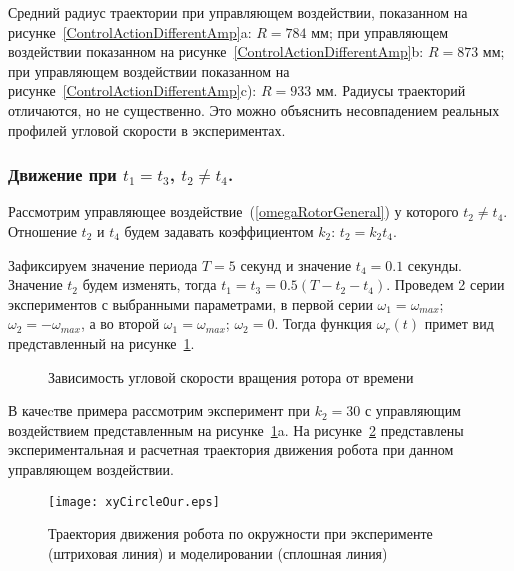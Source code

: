 Средний радиус траектории при управляющем воздействии, показанном на рисунке~\ref{ControlActionDifferentAmp}a: $ R = 784 $ мм; при управляющем воздействии показанном на рисунке~\ref{ControlActionDifferentAmp}b: $ R = 873 $ мм; при управляющем воздействии показанном на рисунке~\ref{ControlActionDifferentAmp}c): $ R = 933 $ мм. Радиусы траекторий отличаются, но не существенно. Это можно объяснить несовпадением реальных профилей угловой скорости в экспериментах.


\subsubsection{Движение при $ t_1 = t_3 $, $ t_2 \neq t_4 $.}

Рассмотрим управляющее воздействие~(\ref{omegaRotorGeneral}) у которого $ t_2 \neq t_4 $. Отношение $ t_2 $ и $t_4 $ будем задавать коэффициентом $ k_2 $: $ t_2 = k_2t_4 $.

Зафиксируем значение периода $ T=5 $ секунд и значение $ t_4 = 0.1 $ секунды. Значение $ t_2 $ будем изменять, тогда $ t_1 = t_3 = 0.5(T - t_2 - t_4) $. Проведем 2 серии экспериментов с выбранными параметрами, в первой серии $ \omega_1 = \omega_{max} $; $ \omega_2 = -\omega_{max} $, а во второй $ \omega_1 = \omega_{max} $; $ \omega_2 = 0 $. Тогда функция $ \omega_r(t) $ примет вид представленный на рисунке~\ref{ControlActionOur}.

\begin{figure}[!ht]
	\begin{minipage}[h]{0.5\linewidth}
	\end{minipage}
	\hfill
	\begin{minipage}[h]{0.5\linewidth}
	\end{minipage}
	\caption{Зависимость угловой скорости вращения ротора от времени}
	\label{ControlActionOur}
\end{figure}

В качеcтве примера рассмотрим эксперимент при $ k_2=30 $ с управляющим воздействием представленным на рисунке~\ref{ControlActionOur}a. На рисунке~\ref{xyCircle2} представлены экспериментальная и расчетная траектория движения робота при данном управляющем воздействии.

\begin{figure}[!h]
	\centering
	\texttt{[image: xyCircleOur.eps]}
	\caption{Траектория движения робота по окружности при эксперименте (штриховая линия) и моделировании (сплошная линия)}
	\label{xyCircle2}
\end{figure}


